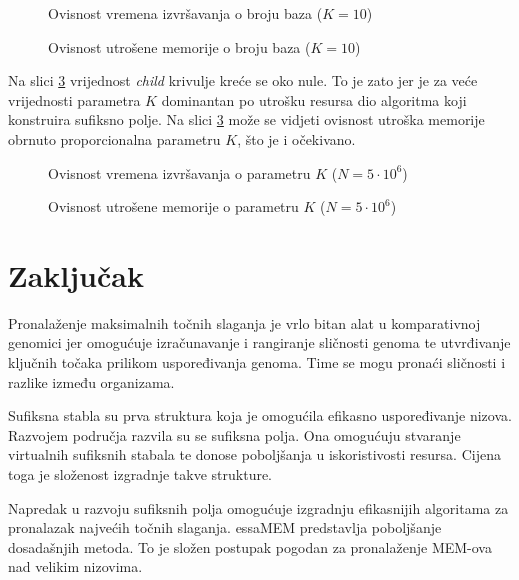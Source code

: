 \documentclass[times, utf8, seminar, numeric]{fer}
\begin{document}
\begin{figure}[!h]
	\centering
	\def\svgwidth{.7\columnwidth}
	
  \caption{Ovisnost vremena izvršavanja o broju baza ($K = 10$)}
  \label{fig:time-base_number}
\end{figure}

\begin{figure}[!h]
	\centering
	\def\svgwidth{.7\columnwidth}
	
  \caption{Ovisnost utrošene memorije o broju baza ($K = 10$)}
  \label{fig:memory-base_number}
\end{figure}

Na slici \ref{fig:time-k} vrijednost \textit{child} krivulje kreće se oko nule. To je zato jer je za veće vrijednosti parametra $K$ dominantan po utrošku resursa dio algoritma koji konstruira sufiksno polje. Na slici \ref{fig:time-k} može se vidjeti ovisnost utroška memorije obrnuto proporcionalna parametru $K$, što je i očekivano.

\begin{figure}[!h]
	\centering
	\def\svgwidth{.7\columnwidth}
	
  \caption{Ovisnost vremena izvršavanja o parametru $K$ ($N = 5 \cdot 10^6$)}
  \label{fig:time-k}
\end{figure}

\begin{figure}[!h]
	\centering
	\def\svgwidth{.7\columnwidth}
	
  \caption{Ovisnost utrošene memorije o parametru $K$ ($N = 5 \cdot 10^6$)}
  \label{fig:memory-k}
\end{figure}

\chapter{Zaključak}
\label{ch:conclusion}

Pronalaženje maksimalnih točnih slaganja je vrlo bitan alat u komparativnoj genomici jer omogućuje izračunavanje i rangiranje sličnosti genoma te utvrđivanje ključnih točaka prilikom uspoređivanja genoma. Time se mogu pronaći sličnosti i razlike između organizama. 

Sufiksna stabla su prva struktura koja je omogućila efikasno uspoređivanje nizova. Razvojem područja razvila su se sufiksna polja. Ona omogućuju stvaranje virtualnih sufiksnih stabala te donose poboljšanja u iskoristivosti resursa. Cijena toga je složenost izgradnje takve strukture.

Napredak u razvoju sufiksnih polja omogućuje izgradnju efikasnijih algoritama za pronalazak najvećih točnih slaganja. essaMEM predstavlja poboljšanje dosadašnjih metoda. To je složen postupak pogodan za pronalaženje MEM-ova nad velikim nizovima. 
\end{document}
